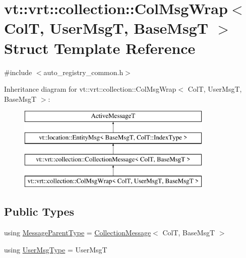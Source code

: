 \hypertarget{structvt_1_1vrt_1_1collection_1_1_col_msg_wrap}{}\section{vt\+:\+:vrt\+:\+:collection\+:\+:Col\+Msg\+Wrap$<$ ColT, User\+MsgT, Base\+MsgT $>$ Struct Template Reference}
\label{structvt_1_1vrt_1_1collection_1_1_col_msg_wrap}


{\ttfamily \#include $<$auto\+\_\+registry\+\_\+common.\+h$>$}

Inheritance diagram for vt\+:\+:vrt\+:\+:collection\+:\+:Col\+Msg\+Wrap$<$ ColT, User\+MsgT, Base\+MsgT $>$\+:\begin{figure}[H]
\begin{center}
\leavevmode
\includegraphics[height=4.000000cm]{structvt_1_1vrt_1_1collection_1_1_col_msg_wrap}
\end{center}
\end{figure}
\subsection*{Public Types}
\begin{DoxyCompactItemize}
\item 
using \hyperlink{structvt_1_1vrt_1_1collection_1_1_col_msg_wrap_a51803f5a5355ade7dc2d1a46753ab4e9}{Message\+Parent\+Type} = \hyperlink{structvt_1_1vrt_1_1collection_1_1_collection_message}{Collection\+Message}$<$ ColT, Base\+MsgT $>$
\item 
using \hyperlink{structvt_1_1vrt_1_1collection_1_1_col_msg_wrap_a168446c6b2feea3a003dbfa02f21e227}{User\+Msg\+Type} = User\+MsgT
\end{DoxyCompactItemize}
